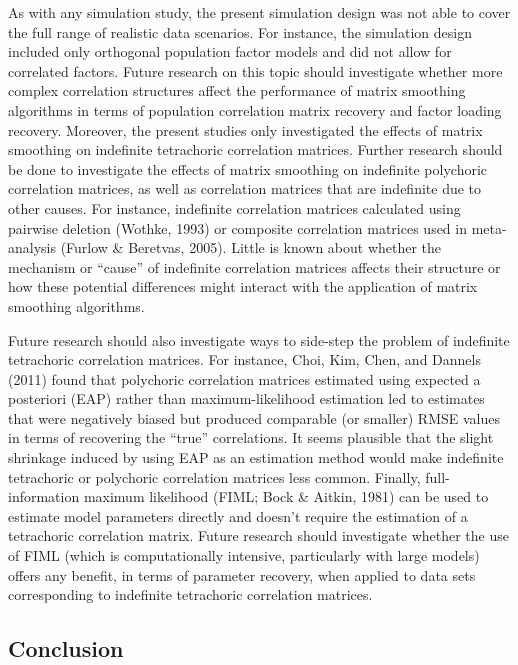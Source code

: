 \documentclass[
  english,
  man]{apa6}
\begin{document}
As with any simulation study, the present simulation design was not able to cover the full range of realistic data scenarios. For instance, the simulation design included only orthogonal population factor models and did not allow for correlated factors. Future research on this topic should investigate whether more complex correlation structures affect the performance of matrix smoothing algorithms in terms of population correlation matrix recovery and factor loading recovery. Moreover, the present studies only investigated the effects of matrix smoothing on indefinite tetrachoric correlation matrices. Further research should be done to investigate the effects of matrix smoothing on indefinite polychoric correlation matrices, as well as correlation matrices that are indefinite due to other causes. For instance, indefinite correlation matrices calculated using pairwise deletion (Wothke, 1993) or composite correlation matrices used in meta-analysis (Furlow \& Beretvas, 2005). Little is known about whether the mechanism or \enquote{cause} of indefinite correlation matrices affects their structure or how these potential differences might interact with the application of matrix smoothing algorithms.

Future research should also investigate ways to side-step the problem of indefinite tetrachoric correlation matrices. For instance, Choi, Kim, Chen, and Dannels (2011) found that polychoric correlation matrices estimated using expected a posteriori (EAP) rather than maximum-likelihood estimation led to estimates that were negatively biased but produced comparable (or smaller) RMSE values in terms of recovering the \enquote{true} correlations. It seems plausible that the slight shrinkage induced by using EAP as an estimation method would make indefinite tetrachoric or polychoric correlation matrices less common. Finally, full-information maximum likelihood (FIML; Bock \& Aitkin, 1981) can be used to estimate model parameters directly and doesn't require the estimation of a tetrachoric correlation matrix. Future research should investigate whether the use of FIML (which is computationally intensive, particularly with large models) offers any benefit, in terms of parameter recovery, when applied to data sets corresponding to indefinite tetrachoric correlation matrices.

\hypertarget{conclusion}{%
\subsection{Conclusion}\label{conclusion}}
\end{document}
